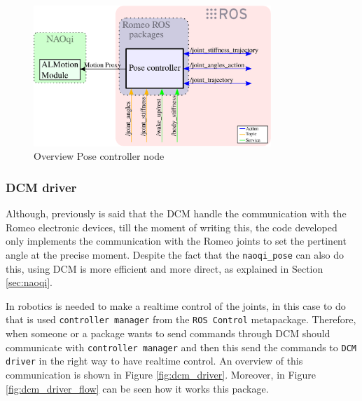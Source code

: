 \documentclass[12pt,a4paper,final,twoside,openright]{report}
\begin{document}

\begin{figure}[h]
\centering
\includegraphics[width=0.8\textwidth]{images/pose_controller.eps}
\caption{Overview Pose controller node\label{fig:pose_controller}}
\end{figure}

\subsubsection{DCM driver}

Although, previously is said that the DCM handle the communication with the Romeo electronic devices, till the moment of writing this, the code developed only implements the communication with the Romeo joints to set the pertinent angle at the precise moment. Despite the fact that the \texttt{naoqi\_pose} can also do this, using DCM is more efficient and more direct, as explained in Section \ref{sec:naoqi}.

In robotics is needed to make a realtime control of the joints, in this case to do that is used \texttt{controller manager} from the \texttt{ROS Control} metapackage. Therefore, when someone or a package wants to send commands through DCM should communicate with \texttt{controller manager} and then this send the commands to \texttt{DCM driver} in the right way to have realtime control. An overview of this communication is shown in Figure \ref{fig:dcm_driver}. Moreover, in Figure \ref{fig:dcm_driver_flow} can be seen how it works this package.
\end{document}
